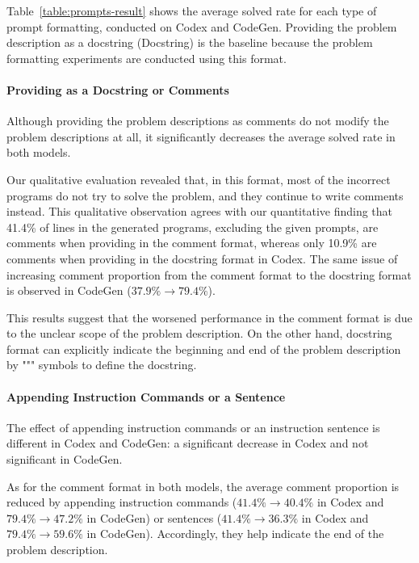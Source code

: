 \documentclass{article}
\begin{document}
Table~\ref{table:prompts-result} shows the average solved rate for each type of prompt formatting, conducted on Codex and CodeGen.
Providing the problem description as a docstring (Docstring) is the baseline because the problem formatting experiments are conducted using this format.





\paragraph{Providing as a Docstring or Comments}

Although providing the problem descriptions as comments do not modify the problem descriptions at all, it significantly decreases the average solved rate in both models.

Our qualitative evaluation revealed that, in this format, most of the incorrect programs do not try to solve the problem, and they continue to write comments instead.
This qualitative observation agrees with our quantitative finding that 41.4\% of lines in the generated programs, excluding the given prompts, are comments when providing in the comment format, whereas only 10.9\% are comments when providing in the docstring format in Codex.
The same issue of increasing comment proportion from the comment format to the docstring format is observed in CodeGen ($37.9\% \rightarrow 79.4\%$).

This results suggest that the worsened performance in the comment format is due to the unclear scope of the problem description.
On the other hand, docstring format can explicitly indicate the beginning and end of the problem description by """ symbols to define the docstring.





\paragraph{Appending Instruction Commands or a Sentence}

The effect of appending instruction commands or an instruction sentence is different in Codex and CodeGen: a significant decrease in Codex and not significant in CodeGen.

As for the comment format in both models, the average comment proportion is reduced by appending instruction commands ($41.4\% \rightarrow 40.4\%$ in Codex and $79.4\% \rightarrow 47.2\%$ in CodeGen) or sentences ($41.4\% \rightarrow 36.3\%$ in Codex and $79.4\% \rightarrow 59.6\%$ in CodeGen).
Accordingly, they help indicate the end of the problem description.
\end{document}
